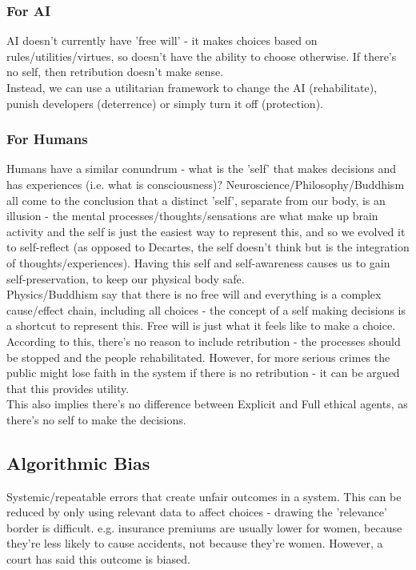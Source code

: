  \subsubsection{For AI}
 AI doesn't currently have 'free will' - it makes choices based on rules/utilities/virtues, so doesn't have the ability to choose otherwise. If there's no self, then retribution doesn't make sense.\\
 Instead, we can use a utilitarian framework to change the AI (rehabilitate), punish developers (deterrence) or simply turn it off (protection).\\
 
 \subsubsection{For Humans}
 Humans have a similar conundrum - what is the 'self' that makes decisions and has experiences (i.e. what is consciousness)? Neuroscience/Philosophy/Buddhism all come to the conclusion that a distinct 'self', separate from our body, is an illusion - the mental processes/thoughts/sensations are what make up brain activity and the self is just the easiest way to represent this, and so we evolved it to self-reflect (as opposed to Decartes, the self doesn't think but is the integration of thoughts/experiences). Having this self and self-awareness causes us to gain self-preservation, to keep our physical body safe.\\
 
 Physics/Buddhism say that there is no free will and everything is a complex cause/effect chain, including all choices - the concept of a self making decisions is a shortcut to represent this. Free will is just what it feels like to make a choice.\\
 
 According to this, there's no reason to include retribution - the processes should be stopped and the people rehabilitated. However, for more serious crimes the public might lose faith in the system if there is no retribution - it can be argued that this provides utility. \\

 This also implies there's no difference between Explicit and Full ethical agents, as there's no self to make the decisions.
 
 \subsection{Algorithmic Bias}
 Systemic/repeatable errors that create unfair outcomes in a system. This can be reduced by only using relevant data to affect choices - drawing the 'relevance' border is difficult. e.g. insurance premiums are usually lower for women, because they're less likely to cause accidents, not because they're women. However, a court has said this outcome is biased.\\
 

